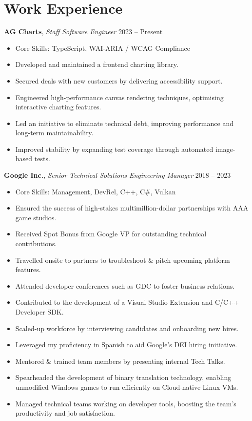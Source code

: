 \documentclass[a4paper,10pt]{article}
\newcommand{\coreskills}[1]{\item Core Skills: #1}
\begin{document}
{\begin{minipage}[t]{0.72\textwidth}
    \section*{\color{navy} Work Experience}

    \textbf{AG Charts}, \textit{Staff Software Engineer} \hfill 2023 -- Present
    \begin{itemize}[leftmargin=1.5em, nosep]
        \coreskills{TypeScript, WAI-ARIA / WCAG Compliance}
        \item Developed and maintained a frontend charting library.
        \item Secured deals with new customers by delivering accessibility support.
        \item Engineered high-performance canvas rendering techniques, optimising interactive charting features.
        \item Led an initiative to eliminate technical debt, improving performance and long-term maintainability.
        \item Improved stability by expanding test coverage through automated image-based tests.
    \end{itemize}
    \vspace{0.5em}

    \textbf{Google Inc.}, \textit{Senior Technical Solutions Engineering Manager} \hfill 2018 -- 2023
    \begin{itemize}[leftmargin=1.5em, nosep]
        \coreskills{Management, DevRel, C++, C\#, Vulkan}
        \item Ensured the success of high-stakes multimillion-dollar partnerships with AAA game studios.
        \item Received Spot Bonus from Google VP for outstanding technical contributions.
        \item Travelled onsite to partners to troubleshoot \& pitch upcoming platform features.
        \item Attended developer conferences such as GDC to foster business relations.
        \item Contributed to the development of a Visual Studio Extension and C/C++ Developer SDK.
        \item Scaled-up workforce by interviewing candidates and onboarding new hires.
        \item Leveraged my proficiency in Spanish to aid Google's DEI hiring initiative.
        \item Mentored \& trained team members by presenting internal Tech Talks.
        \item Spearheaded the development of binary translation technology, enabling unmodified Windows games to run efficiently on Cloud-native Linux VMs.
        \item Managed technical teams working on developer tools, boosting the team's productivity and job satisfaction.
    \end{itemize}
    \vspace{0.5em}


\end{minipage}}
\end{document}
